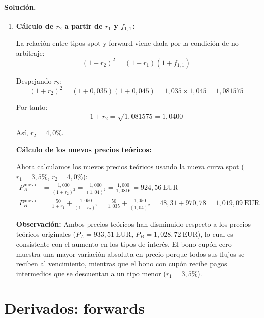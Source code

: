 \documentclass[12pt,a4paper]{article}
\newcommand{\EUR}[1]{\ensuremath{#1~\text{EUR}}}
\newenvironment{solucion}{\paragraph{Solución.}}{}
\begin{document}
\begin{solucion}
\begin{enumerate}[label=\alph*)]
   La duración de Macaulay es:
   \[
   D_B = \frac{1 \times 48{,}46 + 2 \times 986{,}54}{1{,}035} = \frac{2{,}021{,}54}{1{,}035} = 1{,}953\ \text{años}
   \]
   
   La duración del bono con cupón es menor que su vencimiento porque recibe pagos antes del vencimiento.
   
   \item \textbf{Cálculo de \(r_2\) a partir de \(r_1\) y \(f_{1,1}\):}
   
   La relación entre tipos spot y forward viene dada por la condición de no arbitraje:
   \[
   (1+r_2)^2 = (1+r_1)(1+f_{1,1})
   \]
   
   Despejando \(r_2\):
   \[
   (1+r_2)^2 = (1+0{,}035)(1+0{,}045) = 1{,}035 \times 1{,}045 = 1{,}081575
   \]
   
   Por tanto:
   \[
   1+r_2 = \sqrt{1{,}081575} = 1{,}0400
   \]
   
   Así, \(r_2 = 4{,}0\%\).
   
   \textbf{Cálculo de los nuevos precios teóricos:}
   
   Ahora calculamos los nuevos precios teóricos usando la nueva curva spot (\(r_1 = 3{,}5\%\), \(r_2 = 4{,}0\%\)):
   \begin{align*}
   P_A^{\text{nuevo}} &= \frac{1{,}000}{(1+r_2)^2} = \frac{1{,}000}{(1{,}04)^2} = \frac{1{,}000}{1{,}0816} = \EUR{924{,}56}\\
   P_B^{\text{nuevo}} &= \frac{50}{1+r_1} + \frac{1{,}050}{(1+r_2)^2} = \frac{50}{1{,}035} + \frac{1{,}050}{(1{,}04)^2} = 48{,}31 + 970{,}78 = \EUR{1{,}019{,}09}
   \end{align*}
   
   \textbf{Observación:} Ambos precios teóricos han disminuido respecto a los precios teóricos originales (\(P_A = \EUR{933{,}51}\), \(P_B = \EUR{1{,}028{,}72}\)), lo cual es consistente con el aumento en los tipos de interés. El bono cupón cero muestra una mayor variación absoluta en precio porque todos sus flujos se reciben al vencimiento, mientras que el bono con cupón recibe pagos intermedios que se descuentan a un tipo menor (\(r_1 = 3{,}5\%\)).
 \end{enumerate}
 \end{solucion}

 \section{Derivados: forwards}
\end{document}
